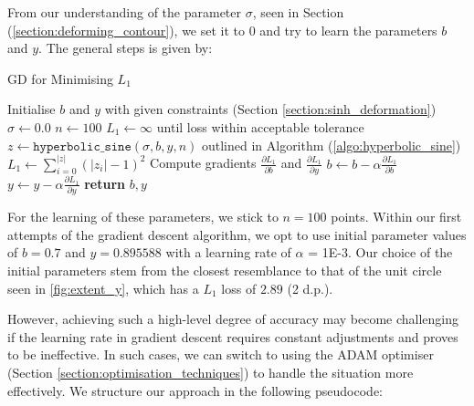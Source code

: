 \documentclass[a4paper]{report}
\begin{document}
From our understanding of the parameter $\sigma$, seen in Section (\ref{section:deforming_contour}), we set it to 0 and try to learn the parameters $b$ and $y$. The general steps is given by:

\begin{algorithm}[H]
\caption{GD for Minimising \( L_1 \)}
\label{algo:gd_l1}
\begin{algorithmic}[1]
    \State Initialise $b$ and $y$ \Comment with given constraints (Section \ref{section:sinh_deformation})
    \State $\sigma \gets 0.0$
    \State $n \gets 100$
    \State $L_1 \gets \infty$
     \Comment until loss within acceptable tolerance 
        \State $z \gets \texttt{hyperbolic\_sine}(\sigma, b, y, n)$ \Comment outlined in Algorithm (\ref{algo:hyperbolic_sine})
        \State $L_1 \gets \sum_{i=0}^{|z|} (|z_i| - 1)^2$
        \State Compute gradients $\frac{\partial L_1}{\partial b}$ and $\frac{\partial L_1}{\partial y}$
        \State $b \gets b - \alpha \frac{\partial L_1}{\partial b}$
        \State $y \gets y - \alpha \frac{\partial L_1}{\partial y}$
    \EndWhile
    \State \textbf{return} $b, y$
\EndProcedure
\end{algorithmic}
\end{algorithm}

For the learning of these parameters, we stick to $n = 100$ points. Within our first attempts of the gradient descent algorithm, we opt to use initial parameter values of $b = 0.7$ and $y = 0.895588$ with a learning rate of $\alpha$ = 1E-3. Our choice of the initial parameters stem from the closest resemblance to that of the unit circle seen in \autoref{fig:extent_y}, which has a $L_1$ loss of $2.89$ (2 d.p.).
 
 However, achieving such a high-level degree of accuracy may become challenging if the learning rate in gradient descent requires constant adjustments and proves to be ineffective. In such cases, we can switch to using the ADAM optimiser (Section \ref{section:optimisation_techniques}) to handle the situation more effectively. We structure our approach in the following pseudocode:
 
\end{document}
